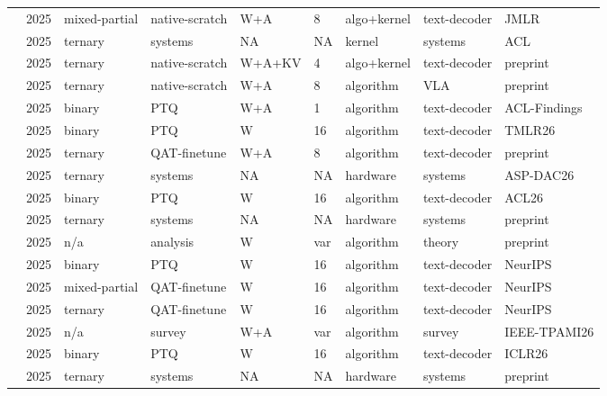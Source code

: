 \begin{landscape}
\begin{longtable}{p{3.2cm} p{1cm} p{1.9cm} p{2.2cm} p{2.2cm} p{1.3cm} p{2.2cm} p{2.1cm} p{2.5cm}}
\citet{Wang2025-BitNetJMLR} & 2025 & mixed-partial & native-scratch & W+\allowbreak{}A & 8 & algo+\allowbreak{}kernel & text-decoder & JMLR \\
\citet{Wang2025-BitNetCPP} & 2025 & ternary & systems & NA & NA & kernel & systems & ACL \\
\citet{Wang2025-BitNetV2} & 2025 & ternary & native-scratch & W+\allowbreak{}A+\allowbreak{}KV & 4 & algo+\allowbreak{}kernel & text-decoder & preprint \\
\citet{Wang2025-BitVLA} & 2025 & ternary & native-scratch & W+\allowbreak{}A & 8 & algorithm & VLA & preprint \\
\citet{Anon2025-BinaryWA-PTQ} & 2025 & binary & PTQ & W+\allowbreak{}A & 1 & algorithm & text-decoder & ACL-Findings \\
\citet{Anon2025-DoubleBinaryFactorization} & 2025 & binary & PTQ & W & 16 & algorithm & text-decoder & TMLR26 \\
\citet{Wu2025-BitNetDistillation} & 2025 & ternary & QAT-finetune & W+\allowbreak{}A & 8 & algorithm & text-decoder & preprint \\
\citet{Zhang2025-BitROM} & 2025 & ternary & systems & NA & NA & hardware & systems & ASP-DAC26 \\
\citet{Gu2025-BTCLLM} & 2025 & binary & PTQ & W & 16 & algorithm & text-decoder & ACL26 \\
\citet{Anon2025-CPUvsGPU} & 2025 & ternary & systems & NA & NA & hardware & systems & preprint \\
\citet{Anon2025-CompressionScalingLaws} & 2025 & n/\allowbreak{}a & analysis & W & var & algorithm & theory & preprint \\
\citet{Chen2025-HBLLM} & 2025 & binary & PTQ & W & 16 & algorithm & text-decoder & Neur\allowbreak{}IPS \\
\citet{Anon2025-STE-ZerothOrder} & 2025 & mixed-partial & QAT-finetune & W & 16 & algorithm & text-decoder & Neur\allowbreak{}IPS \\
\citet{Chen2025-LoTAQAF} & 2025 & ternary & QAT-finetune & W & 16 & algorithm & text-decoder & Neur\allowbreak{}IPS \\
\citet{Hao2025-LowPrecTrainingSurvey} & 2025 & n/\allowbreak{}a & survey & W+\allowbreak{}A & var & algorithm & survey & IEEE-TPAMI26 \\
\citet{Anon2025-MultiBoolean} & 2025 & binary & PTQ & W & 16 & algorithm & text-decoder & ICLR26 \\
\citet{Malekar2025-PIMLLM} & 2025 & ternary & systems & NA & NA & hardware & systems & preprint \\

\end{longtable}
\end{landscape}
